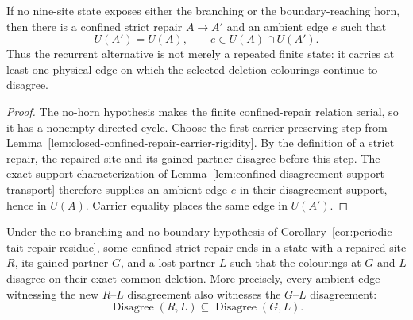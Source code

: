 \begin{corollary}
\label{cor:no-horn-persistent-disagreement-carrier}
If no nine-site state exposes either the branching or the boundary-reaching
horn, then there is a confined strict repair $A\longrightarrow A'$ and an
ambient edge $e$ such that
\[
                    U(A')=U(A),
        \qquad e\in U(A)\cap U(A').
\]
Thus the recurrent alternative is not merely a repeated finite state: it
carries at least one physical edge on which the selected deletion colourings
continue to disagree.
\end{corollary}

\begin{proof}
The no-horn hypothesis makes the finite confined-repair relation serial, so
it has a nonempty directed cycle.  Choose the first carrier-preserving step
from Lemma~\ref{lem:closed-confined-repair-carrier-rigidity}.  By the
definition of a strict repair, the repaired site and its gained partner
disagree before this step.  The exact support characterization of
Lemma~\ref{lem:confined-disagreement-support-transport} therefore supplies
an ambient edge $e$ in their disagreement support, hence in $U(A)$.
Carrier equality places the same edge in $U(A')$.
\end{proof}

\begin{corollary}
\label{cor:forced-partner-disagreement-propagation}
Under the no-branching and no-boundary hypothesis of
Corollary~\ref{cor:periodic-tait-repair-residue}, some confined strict repair
ends in a state with a repaired site $R$, its gained partner $G$, and a lost
partner $L$ such that the colourings at $G$ and $L$ disagree on their exact
common deletion.  More precisely, every ambient edge witnessing the new
$R$--$L$ disagreement also witnesses the $G$--$L$ disagreement:
\[
 \operatorname{Disagree}(R,L)\subseteq
 \operatorname{Disagree}(G,L).
\]
\end{corollary}

